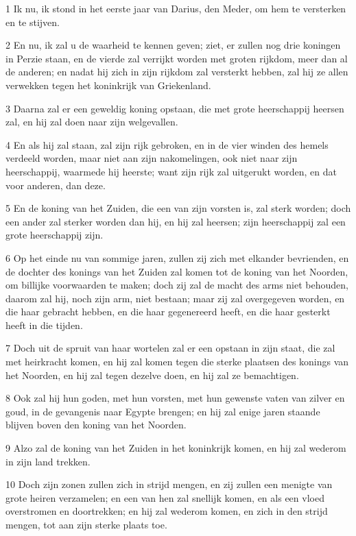 \par 1 Ik nu, ik stond in het eerste jaar van Darius, den Meder, om hem te versterken en te stijven.
\par 2 En nu, ik zal u de waarheid te kennen geven; ziet, er zullen nog drie koningen in Perzie staan, en de vierde zal verrijkt worden met groten rijkdom, meer dan al de anderen; en nadat hij zich in zijn rijkdom zal versterkt hebben, zal hij ze allen verwekken tegen het koninkrijk van Griekenland.
\par 3 Daarna zal er een geweldig koning opstaan, die met grote heerschappij heersen zal, en hij zal doen naar zijn welgevallen.
\par 4 En als hij zal staan, zal zijn rijk gebroken, en in de vier winden des hemels verdeeld worden, maar niet aan zijn nakomelingen, ook niet naar zijn heerschappij, waarmede hij heerste; want zijn rijk zal uitgerukt worden, en dat voor anderen, dan deze.
\par 5 En de koning van het Zuiden, die een van zijn vorsten is, zal sterk worden; doch een ander zal sterker worden dan hij, en hij zal heersen; zijn heerschappij zal een grote heerschappij zijn.
\par 6 Op het einde nu van sommige jaren, zullen zij zich met elkander bevrienden, en de dochter des konings van het Zuiden zal komen tot de koning van het Noorden, om billijke voorwaarden te maken; doch zij zal de macht des arms niet behouden, daarom zal hij, noch zijn arm, niet bestaan; maar zij zal overgegeven worden, en die haar gebracht hebben, en die haar gegenereerd heeft, en die haar gesterkt heeft in die tijden.
\par 7 Doch uit de spruit van haar wortelen zal er een opstaan in zijn staat, die zal met heirkracht komen, en hij zal komen tegen die sterke plaatsen des konings van het Noorden, en hij zal tegen dezelve doen, en hij zal ze bemachtigen.
\par 8 Ook zal hij hun goden, met hun vorsten, met hun gewenste vaten van zilver en goud, in de gevangenis naar Egypte brengen; en hij zal enige jaren staande blijven boven den koning van het Noorden.
\par 9 Alzo zal de koning van het Zuiden in het koninkrijk komen, en hij zal wederom in zijn land trekken.
\par 10 Doch zijn zonen zullen zich in strijd mengen, en zij zullen een menigte van grote heiren verzamelen; en een van hen zal snellijk komen, en als een vloed overstromen en doortrekken; en hij zal wederom komen, en zich in den strijd mengen, tot aan zijn sterke plaats toe.
